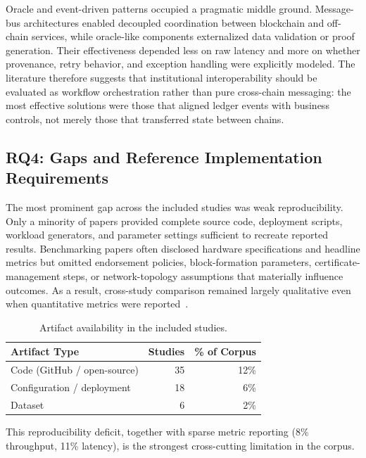 \documentclass[journal]{IEEEtran}
\begin{document}
Oracle and event-driven patterns occupied a pragmatic middle ground. Message-bus architectures enabled decoupled coordination between blockchain and off-chain services, while oracle-like components externalized data validation or proof generation. Their effectiveness depended less on raw latency and more on whether provenance, retry behavior, and exception handling were explicitly modeled. The literature therefore suggests that institutional interoperability should be evaluated as workflow orchestration rather than pure cross-chain messaging: the most effective solutions were those that aligned ledger events with business controls, not merely those that transferred state between chains.

\subsection{RQ4: Gaps and Reference Implementation Requirements}

The most prominent gap across the included studies was weak reproducibility. Only a minority of papers provided complete source code, deployment scripts, workload generators, and parameter settings sufficient to recreate reported results. Benchmarking papers often disclosed hardware specifications and headline metrics but omitted endorsement policies, block-formation parameters, certificate-management steps, or network-topology assumptions that materially influence outcomes. As a result, cross-study comparison remained largely qualitative even when quantitative metrics were reported~\cite{dinh2017blockbench,gorenflo2020fastfabric,diangelo2018comparative}.

\begin{table}[h]
\centering
\small
\begin{tabular}{lrr}
\toprule
\textbf{Artifact Type} & \textbf{Studies} & \textbf{\% of Corpus} \\
\midrule
Code (GitHub / open-source) & 35 & 12\% \\
Configuration / deployment & 18 & 6\% \\
Dataset & 6 & 2\% \\
\bottomrule
\end{tabular}
\caption{Artifact availability in the included studies.}
\label{tab:artifacts}
\end{table}

\noindent This reproducibility deficit, together with sparse metric reporting (8\% throughput, 11\% latency), is the strongest cross-cutting limitation in the corpus.
\end{document}
